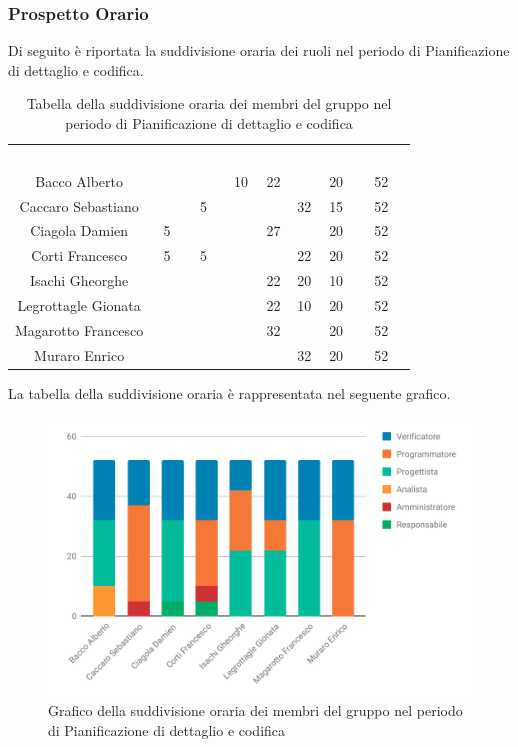 \subsubsection{Prospetto Orario}
Di seguito è riportata la suddivisione oraria dei ruoli nel periodo di Pianificazione di dettaglio e codifica.




\begin{table}[H]	
	\begin{center}
	    \begin{tabular}{cccccccc}
			\rowcolor{greySWEight}
			\textcolor{white}{\textbf{Nome}} & \textcolor{white}{\textbf{Re}} & \textcolor{white}{\textbf{Am}} & \textcolor{white}{\textbf{An}} & \textcolor{white}{\textbf{Pj}} & \textcolor{white}{\textbf{Pr}} & \textcolor{white}{\textbf{Ve}} & \textcolor{white}{\textbf{Totale}}
			\\ 
			Bacco Alberto & & & 10 & 22 & & 20 & 52 \\
			Caccaro Sebastiano & & 5 & & & 32 & 15 & 52 \\
			Ciagola Damien & 5 & & & 27 & & 20 & 52 \\
			Corti Francesco & 5 & 5 & & & 22 & 20 & 52 \\
			Isachi Gheorghe & & & & 22 & 20 & 10 & 52 \\
			Legrottagle Gionata & & & & 22 & 10 & 20 & 52 \\
			Magarotto Francesco & & & & 32 & & 20 & 52 \\
			Muraro Enrico & & & & & 32 & 20 & 52 \\
			\end{tabular}
	    \caption{Tabella della suddivisione oraria dei membri del gruppo nel periodo di Pianificazione di dettaglio e codifica} \label{tab:tabellaPersonePianificazione di dettaglio e codifica} 
	\end{center}
\end{table}

La tabella della suddivisione oraria è rappresentata nel seguente grafico.
\begin{figure}[H]
\centering
	\includegraphics[width=1\linewidth]{Preventivo/grafici/PC1.pdf}
	\caption{Grafico della suddivisione oraria dei membri del gruppo nel periodo di Pianificazione di dettaglio e codifica}
\end{figure}

